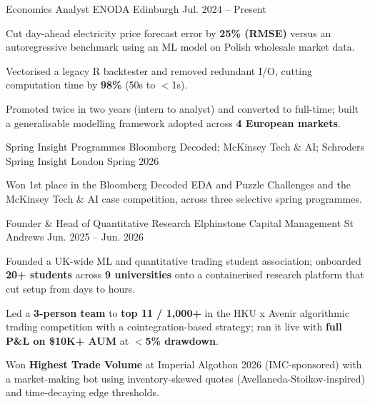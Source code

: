 

\begin{cventries}

  \cventry
    {Economics Analyst} %
    {ENODA} %
    {Edinburgh} %
    {Jul. 2024 -- Present} %
    {
      \begin{cvitems}
        \item {Cut day-ahead electricity price forecast error by \textbf{25\% (RMSE)} versus an autoregressive benchmark using an ML model on Polish wholesale market data.}
        \item {Vectorised a legacy R backtester and removed redundant I/O, cutting computation time by \textbf{98\%} (50s to $<$1s).}
        \item {Promoted twice in two years (intern to analyst) and converted to full-time; built a generalisable modelling framework adopted across \textbf{4 European markets}.}
      \end{cvitems}
    }

  \cventry
    {Spring Insight Programmes} %
    {Bloomberg Decoded; McKinsey Tech \& AI; Schroders Spring Insight} %
    {London} %
    {Spring 2026} %
    {
      \begin{cvitems}
        \item {Won 1st place in the Bloomberg Decoded EDA and Puzzle Challenges and the McKinsey Tech \& AI case competition, across three selective spring programmes.}
      \end{cvitems}
    }

  \cventry
    {Founder \& Head of Quantitative Research} %
    {Elphinstone Capital Management} %
    {St Andrews} %
    {Jun. 2025 -- Jun. 2026} %
    {
      \begin{cvitems}
        \item {Founded a UK-wide ML and quantitative trading student association; onboarded \textbf{20+ students} across \textbf{9 universities} onto a containerised research platform that cut setup from days to hours.}
        \item {Led a \textbf{3-person team} to \textbf{top 11 / 1,000+} in the HKU x Avenir algorithmic trading competition with a cointegration-based strategy; ran it live with \textbf{full P\&L on \$10K+ AUM} at \textbf{$<$5\% drawdown}.}
        \item {Won \textbf{Highest Trade Volume} at Imperial Algothon 2026 (IMC-sponsored) with a market-making bot using inventory-skewed quotes (Avellaneda-Stoikov-inspired) and time-decaying edge thresholds.}
      \end{cvitems}
    }


\end{cventries}
